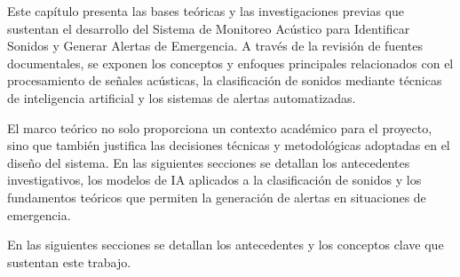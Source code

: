 
Este capítulo presenta las bases teóricas y las investigaciones previas que sustentan el desarrollo del Sistema de Monitoreo Acústico para Identificar Sonidos y Generar Alertas de Emergencia. A través de la revisión de fuentes documentales, se exponen los conceptos y enfoques principales relacionados con el procesamiento de señales acústicas, la clasificación de sonidos mediante técnicas de inteligencia artificial y los sistemas de alertas automatizadas.

El marco teórico no solo proporciona un contexto académico para el proyecto, sino que también justifica las decisiones técnicas y metodológicas adoptadas en el diseño del sistema. En las siguientes secciones se detallan los antecedentes investigativos, los modelos de IA aplicados a la clasificación de sonidos y los fundamentos teóricos que permiten la generación de alertas en situaciones de emergencia.

En las siguientes secciones se detallan los antecedentes y los conceptos clave que sustentan este trabajo.







